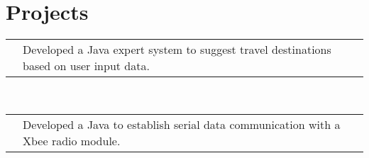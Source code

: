 \documentclass[11pt,a4paper,sans]{moderncv}
\makeatletter
\renewcommand*{\cvline}[3][.25em]{%
	  \begin{tabular}{@{}p{\hintscolumnwidth}@{\hspace{\separatorcolumnwidth}}p{\maincolumnwidth}@{}}%
          \centering\hintfont{#2} &{#3}%
	  \end{tabular}\\[#1]}
\makeatother
\begin{document}
\section{Projects}
\cvline{Artificial Intelligence}{Developed a Java expert system to suggest travel destinations based on user input data. \newline{\emph{Implemented the forward and backward chaining methods and designed the GUI in Swing}} \ENTRYSPACE}
\cvline{Data Analysis}{Developed a Java to establish serial data communication with a Xbee radio module.  \newline{\emph{Wrote the documentation and employed Git version control system}} }
\end{document}
